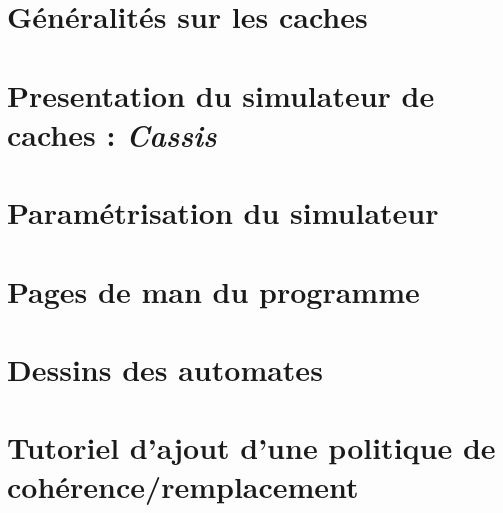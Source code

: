 \documentclass[a4paper]{report}
\begin{document}


\newpage
\tableofcontents

\renewcommand{\labelitemi}{$\bullet$}

\newpage

\newpage
\chapter{Généralités sur les caches}

\newpage
\chapter{Presentation du simulateur de caches : \emph{Cassis}}

\newpage
\chapter{Paramétrisation du simulateur}

\newpage
\appendix
\chapter{Pages de man du programme}

\chapter{Dessins des automates}

\chapter{Tutoriel d'ajout d'une politique de cohérence/remplacement}

\nocite{*}


\end{document}
